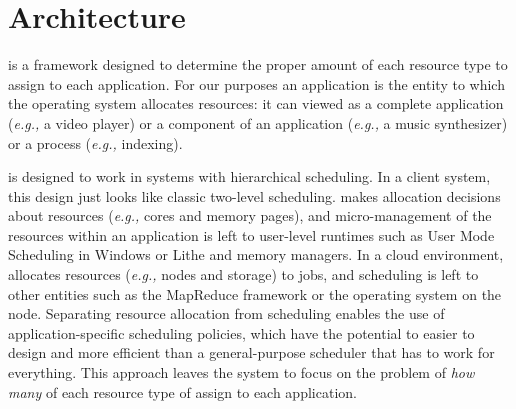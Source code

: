 \section{\pacora Architecture}




\pacora is a framework designed to determine the proper amount of each resource type to assign to each application.  For our purposes an application is the entity to which the operating system allocates resources: it can viewed as a complete application (\emph{e.g.,} a video player) or a component of an application (\emph{e.g.,} a music synthesizer) or a process (\emph{e.g.,} indexing).  
 
\pacora is designed to work in systems with hierarchical scheduling.  In a client system, this design just looks like classic two-level scheduling.  \pacora makes allocation decisions about resources (\emph{e.g.,} cores and memory pages), and micro-management of the resources within an application is left to user-level runtimes such as User Mode Scheduling in Windows\cite{um_sched} or Lithe\cite{lithe} and memory managers.  In a cloud environment, \pacora allocates resources (\emph{e.g.,} nodes and storage) to jobs, and scheduling is left to other entities such as the MapReduce framework\cite{mapreduce} or the operating system on the node.  Separating resource allocation from scheduling enables the use of application-specific scheduling policies, which have the potential to easier to design and more efficient than a general-purpose scheduler that has to work for everything.   This approach leaves the system to focus on the problem of \emph{how many} of each resource type of assign to each application. 

